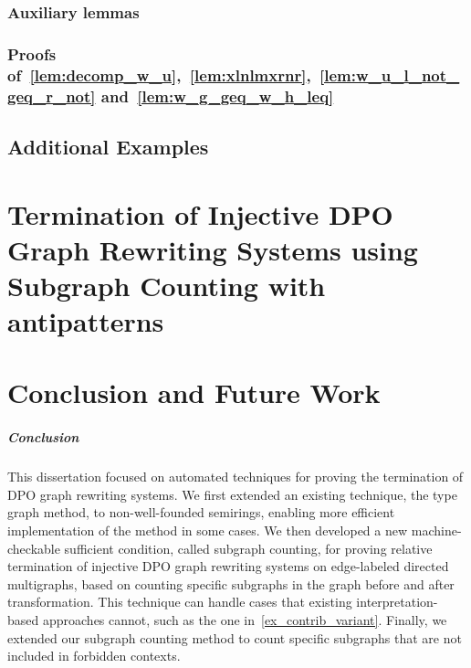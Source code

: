 \documentclass{report}
\begin{document}
\subsection{Auxiliary lemmas}

\subsection{Proofs of~\autoref{lem:decomp_w_u},~\autoref{lem:xlnlmxrnr},~\autoref{lem:w_u_l_not_geq_r_not} and~\autoref{lem:w_g_geq_w_h_leq}}
\label{sec:appendix:a}


\section{Additional Examples}




% 




\chapter{Termination of Injective DPO Graph Rewriting
Systems using Subgraph Counting with antipatterns}
 

 

\chapter{Conclusion and Future Work}
\paragraph{Conclusion}
This dissertation focused on automated techniques for proving the termination of DPO graph rewriting systems.
We first extended an existing technique, the type graph method, to non-well-founded semirings, enabling more efficient implementation of the method in some cases.
We then developed a new machine-checkable sufficient condition, called subgraph counting, for proving relative termination of injective DPO graph rewriting systems on edge-labeled directed multigraphs, based on counting specific subgraphs in the graph before and after transformation. This technique can handle cases that existing interpretation-based approaches cannot, such as the one in~\autoref{ex_contrib_variant}.
Finally, we extended our subgraph counting method to count specific subgraphs that are not included in forbidden contexts.
\end{document}
